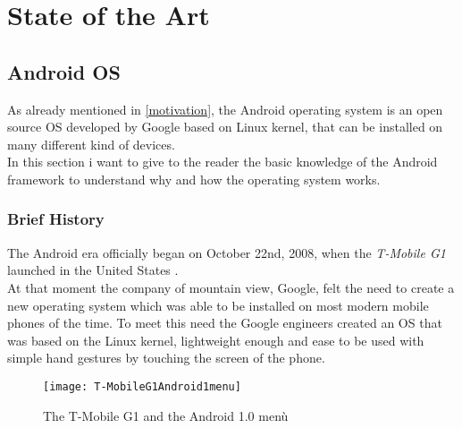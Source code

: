 %
%
\chapter{State of the Art}
%
\label{cap:statoarte}
%
%
\section{Android OS} \label{androidos}
\par As already mentioned in \ref{motivation}, the Android operating system is an open source OS developed by Google based on Linux kernel, that can be installed on many different kind of devices.\\
In this section i want to give to the reader the basic knowledge of the Android framework to understand why and how the operating system works.
\subsection{Brief History} \label{briefhist}
\par
The Android era officially began on October 22nd, 2008, when the \textit{T-Mobile G1} launched in the United States \cite{verge2011android}.\\
At that moment the company of mountain view, Google, felt the need to create a new operating system which was able to be installed on most modern mobile phones of the time. To meet this need the Google engineers created an OS that was based on the Linux kernel, lightweight enough and ease to be used with simple hand gestures by touching the screen of the phone.\\

\begin{figure}[h]
	\centering
	\texttt{[image: T-MobileG1Android1menu]}
	\caption{The T-Mobile G1 and the Android 1.0 menù}
	\label{2.1:The T-Mobile G1 and the Android 1.0 menù}
\end{figure}

